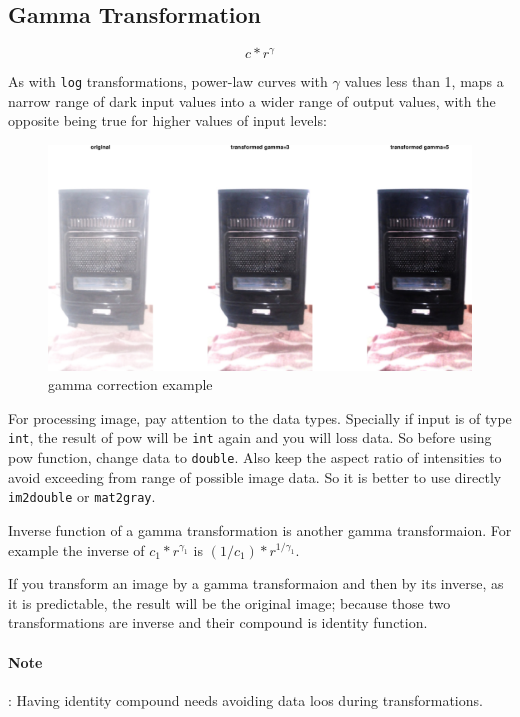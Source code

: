 \subsection{Gamma Transformation}

\[
    c*r^{\gamma}
\]

As with \texttt{log} transformations, power-law curves with $\gamma$ values 
less than 1, maps a narrow range of dark input values into a wider range of 
output values, with the opposite being true for higher values of input levels:

\begin{figure}[htb!]
    \includegraphics[scale=0.2]{gamma_correction_example.eps}
    \centering
    \caption{gamma correction example}
    \label{fig:gamma_correction_example}
\end{figure}

For processing image, pay attention to the data types. Specially if input is of
type \texttt{int}, the result of pow will be \texttt{int} again and you will 
loss data. So before using pow function, change data to \texttt{double}. Also 
keep the aspect ratio of intensities to avoid exceeding from range of possible 
image data. So it is better to use directly \texttt{im2double} or 
\texttt{mat2gray}.

Inverse function of a gamma transformation is another gamma transformaion. For
example the inverse of $c_1*r^{\gamma_1}$ is $(1/c_1)*r^{1/\gamma_1}$.

If you transform an image by a gamma transformaion and then by its inverse, as
it is predictable, the result will be the original image; because those two
transformations are inverse and their compound is identity function. 
\paragraph*{Note}: Having identity compound needs avoiding data loos during 
transformations.

